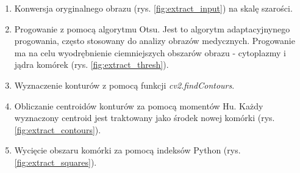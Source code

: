 \begin{enumerate}
    \item Konwersja oryginalnego obrazu (rys. \ref{fig:extract_input}) na skalę szarości.
    \item Progowanie z pomocą algorytmu Otsu.
    Jest to algorytm adaptacyjnynego progowania, często stosowany do analizy obrazów medycznych.
    Progowanie ma na celu wyodrębnienie ciemniejszych obszarów obrazu - cytoplazmy i jądra komórek (rys. \ref{fig:extract_thresh}).
    \item Wyznaczenie konturów z pomocą funkcji \textit{cv2.findContours}.
    \item Obliczanie centroidów konturów za pomocą momentów Hu. Każdy wyznaczony centroid jest traktowany jako środek nowej komórki (rys. \ref{fig:extract_contours}).
    \item Wycięcie obszaru komórki za pomocą indeksów Python (rys. \ref{fig:extract_squares}).
\end{enumerate}
